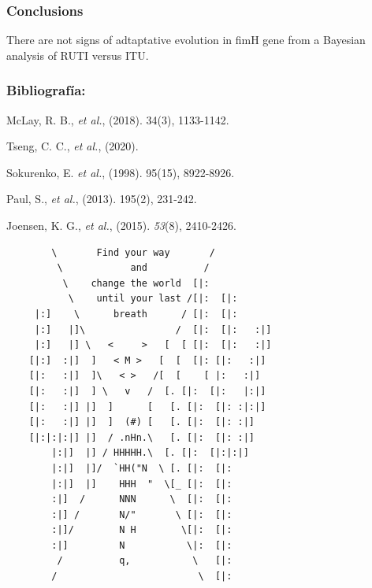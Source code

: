 \documentclass[
]{article}
\begin{document}
\hypertarget{conclusions}{%
\subsubsection{Conclusions}\label{conclusions}}

There are not signs of adtaptative evolution in fimH gene from a
Bayesian analysis of RUTI versus ITU.

\hypertarget{bibliografuxeda}{%
\subsubsection{Bibliografía:}\label{bibliografuxeda}}

McLay, R. B., \emph{et al.}, (2018). 34(3), 1133-1142.

Tseng, C. C., \emph{et al.}, (2020).

Sokurenko, E. \emph{et al.}, (1998). 95(15), 8922-8926.

Paul, S., \emph{et al.}, (2013). 195(2), 231-242.

Joensen, K. G., \emph{et al.}, (2015). \emph{53}(8), 2410-2426.

\begin{verbatim}
        \       Find your way       /
         \            and          /   
          \    change the world  [|:  
           \    until your last /[|:  [|:
     |:]    \      breath      / [|:  [|:
     |:]   |]\                /  [|:  [|:   :|]
     |:]   |] \   <     >   [  [ [|:  [|:   :|]
    [|:]  :|]  ]   < M >   [  [  [|: [|:   :|]
    [|:   :|]  ]\   < >   /[  [    [ |:   :|]  
    [|:   :|]  ] \   v   /  [. [|:  [|:   |:|]
    [|:   :|] |]  ]      [   [. [|:  [|: :|:|]
    [|:   :|] |]  ]  (#) [   [. [|:  [|: :|]
    [|:|:|:|] |]  / .nHn.\   [. [|:  [|: :|]
        |:|]  |] / HHHHH.\  [. [|:  [|:|:|]
        |:|]  |]/  `HH("N  \ [. [|:  [|:
        |:|]  |]    HHH  "  \[_ [|:  [|:
        :|]  /      NNN      \  [|:  [|:  
        :|] /       N/"       \ [|:  [|:  
        :|]/        N H        \[|:  [|:
        :|]         N           \|:  [|:
         /          q,           \   [|:
        /                         \  [|:
\end{verbatim}
\end{document}
